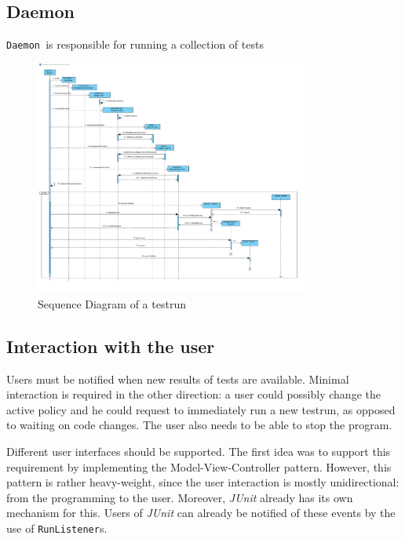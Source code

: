 \documentclass[i2]{oss}
\newcommand{\class}[1]{\texttt{#1}}
\newcommand{\junit}{\emph{JUnit }}
\newcommand{\Deamon}{\class{Daemon  }}
\begin{document}

\subsection{Daemon}
\label{subssec: daemon}

\Deamon is responsible for running a collection of tests 


\begin{figure}[tbp]
\begin{center}
    \includegraphics[width=0.8\textwidth]{RunATestrun}
    \caption{Sequence Diagram of a testrun}
	\label{fig:seq testrun}
\end{center}
\end{figure}




\subsection{Interaction with the user}

Users must be notified when new results of tests are available.
Minimal interaction is required in the other direction: a user could possibly change the active policy and he could request to immediately run a new testrun, as opposed to waiting on code changes.
The user also needs to be able to stop the program.

Different user interfaces should be supported.
The first idea was to support this requirement by implementing the Model-View-Controller pattern.
However, this pattern is rather heavy-weight, since the user interaction is mostly unidirectional: from the programming to the user.
Moreover, \junit already has its own mechanism for this.
Users of \junit can already be notified of these events by the use of \class{RunListener}s.
\end{document}
